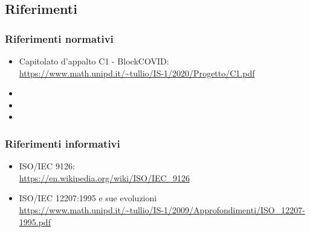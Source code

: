 \subsection{Riferimenti}

\subsubsection{Riferimenti normativi}
\begin{itemize}
\item Capitolato d'appalto C1 - BlockCOVID: \\
\url{https://www.math.unipd.it/~tullio/IS-1/2020/Progetto/C1.pdf}
\item {}
\item {}
\item {}
\end{itemize}
\subsubsection{Riferimenti informativi}
\begin{itemize}
\item ISO/IEC 9126: \\
\url{https://en.wikipedia.org/wiki/ISO/IEC_9126}
\item ISO/IEC 12207:1995 e sue evoluzioni \\
\url{https://www.math.unipd.it/~tullio/IS-1/2009/Approfondimenti/ISO_12207-1995.pdf}
\end{itemize}


